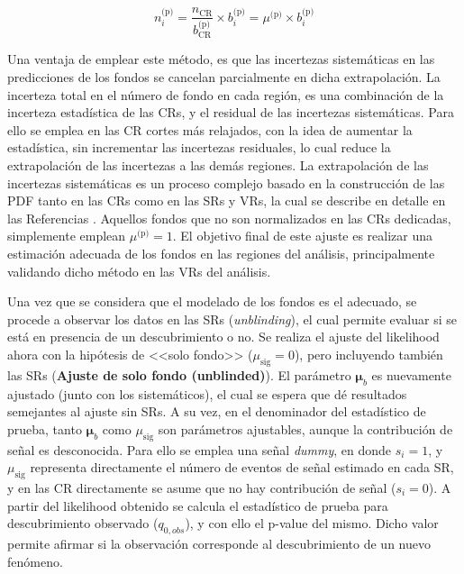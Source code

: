 

\begin{equation}
	n_i^{\text{(p)}} = \frac{n_{\text{CR}}}{b_{\text{CR}}^{\text{(p)}}} \times b_i^{\text{(p)}} = \mu^{\text{(p)}} \times b_i^{\text{(p)}}
\end{equation}

Una ventaja de emplear este método, es que las incertezas sistemáticas en las predicciones de los fondos se cancelan parcialmente en dicha extrapolación. La incerteza total en el número de fondo en cada región, es una combinación de la incerteza estadística de las CRs, y el residual de las incertezas sistemáticas. Para ello se emplea en las CR cortes más relajados, con la idea de aumentar la estadística, sin incrementar las incertezas residuales, lo cual reduce la extrapolación de las incertezas a las demás regiones. La extrapolación de las incertezas sistemáticas es un proceso complejo basado en la construcción de las PDF tanto en las CRs como en las SRs y VRs, la cual se describe en detalle en las Referencias \cite{Baak:2014wma, Cranmer:1456844}. Aquellos fondos que no son normalizados en las CRs dedicadas, simplemente emplean $\mu^{\text{(p)}}=1$. El objetivo final de este ajuste es realizar una estimación adecuada de los fondos en las regiones del análisis, principalmente validando dicho método en las VRs del análisis.

Una vez que se considera que el modelado de los fondos es el adecuado, se procede a observar los datos en las SRs (\textit{unblinding}), el cual permite evaluar si se está en presencia de un descubrimiento o no. Se realiza el ajuste del likelihood ahora con la hipótesis de <<solo fondo>> ($\mu_\text{sig}=0$), pero incluyendo también las SRs (\textbf{Ajuste de solo fondo (unblinded)}). El parámetro $\bm{\mu}_b$ es nuevamente ajustado (junto con los sistemáticos), el cual se espera que dé resultados semejantes al ajuste sin SRs. A su vez, en el denominador del estadístico de prueba, tanto $\bm{\mu}_b$ como $\mu_\text{sig}$ son parámetros ajustables, aunque la contribución de señal es desconocida. Para ello se emplea una señal \textit{dummy}, en donde $s_i=1$, y $\mu_\text{sig}$ representa directamente el número de eventos de señal estimado en cada SR, y en las CR directamente se asume que no hay contribución de señal ($s_i=0$). 
A partir del likelihood obtenido se calcula el estadístico de prueba para descubrimiento observado ($q_{0, obs}$), y con ello el p-value del mismo. Dicho valor permite  afirmar si la observación corresponde al descubrimiento de un nuevo fenómeno.


